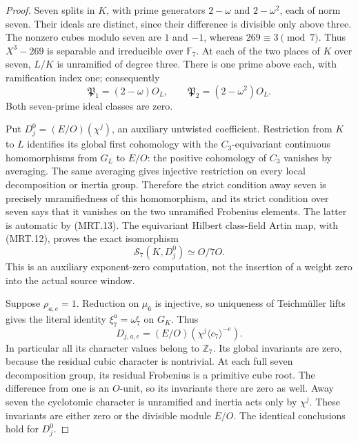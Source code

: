 \begin{proof}
Seven splits in $K$, with prime generators $2-\omega$ and
$2-\omega^2$, each of norm seven.  Their ideals are distinct,
since their difference is divisible only above three.
The nonzero cubes modulo seven are $1$ and $-1$, whereas
$269\equiv3\pmod7$.  Thus $X^3-269$ is separable and
irreducible over $\mathbb F_7$.  At each of the two places of $K$
over seven, $L/K$ is unramified of degree three.  There is one
prime above each, with ramification index one; consequently
\[
        \mathfrak P_1=(2-\omega)O_L,
        \qquad \mathfrak P_2=(2-\omega^2)O_L.                  \tag{MRT.13}
\]
Both seven-prime ideal classes are zero.

Put $D_j^0=(E/O)(\chi^j)$, an auxiliary untwisted coefficient.
Restriction from $K$ to $L$ identifies its global first cohomology
with the $C_3$-equivariant continuous homomorphisms from $G_L$
to $E/O$: the positive cohomology of $C_3$ vanishes by averaging.
The same averaging gives injective restriction on every local
decomposition or inertia group.  Therefore the strict condition
away seven is precisely unramifiedness of this homomorphism,
and its strict condition over seven says that it vanishes on the
two unramified Frobenius elements.  The latter is automatic by
(MRT.13).  The equivariant Hilbert class-field Artin map, with
(MRT.12), proves the exact isomorphism
\[
                         \mathcal S_7(K,D_j^0)\simeq O/7O.
 \tag{MRT.14}
\]
This is an auxiliary exponent-zero computation, not the insertion
of a weight zero into the actual source window.

Suppose $\rho_{a,e}=1$.  Reduction on $\mu_6$ is injective,
so uniqueness of Teichm\"uller lifts gives the literal identity
$\xi_7^a=\omega_7^e$ on $G_K$.  Thus
\[
             D_{j,a,e}=(E/O)(\chi^j\langle c_7\rangle^{-e}).
 \tag{MRT.15}
\]
In particular all its character values belong to $\mathbb Z_7$.
Its global invariants are zero, because the residual cubic
character is nontrivial.  At each full seven decomposition group,
its residual Frobenius is a primitive cube root.  The difference
from one is an $O$-unit, so its invariants there are zero as well.
Away seven the cyclotomic character is unramified and inertia acts
only by $\chi^j$.  These invariants are either zero or the divisible
module $E/O$.  The identical conclusions hold for $D_j^0$.


\end{proof}
